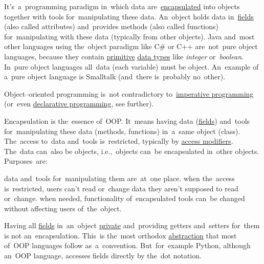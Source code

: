 
\label{objectorientedprogramming}
It's~a~programming paradigm in~which data are~\hyperref[encapsulation]{encapsulated} into objects together with tools for~manipulating these data.
An~object holds data in~\hyperref[variablefieldproperty]{fields} (also called attributes) and~provides methods (also called functions) for~manipulating with these data (typically from other objects).
Java and~most other languages using the~object paradigm like C\# or C++ are~not~pure object languages, because they contain \hyperref[javadatatypes]{primitive} \hyperref[datatypes]{data types} like \textit{integer} or~\textit{boolean}.
In~pure object languages all~data (each variable) must be object.
An~example of a~pure object language is Smalltalk (and~there is~probably no~other).

\warning Object--oriented programming is~not contradictory to~\hyperref[imperativeprogramming]{imperative programming} (or~even \hyperref[declarativeprogramming]{declarative programming}, see further).


\label{encapsulation}
Encapsulation is the~essence of~OOP\@.
It~means having data (\hyperref[variablefieldproperty]{fields}) and~tools for~manipulating these data (methods, functions) in~a~same object (class).
The~access to~data and~tools is~restricted, typically by \hyperref[javaaccessmodifiers]{access modifiers}.
The~data can~also be objects, i.e.,~objects can~be encapsulated in~other objects.
Purposes~are:
\begin{itemize}
     data and~tools for~manipulating them are~at~one place.
     when the~access is~restricted, users can't read or~change data they aren't supposed to read or~change.
     when needed, functionality of~encapsulated tools can~be changed without affecting users of~the~object.
\end{itemize}

\warning Having all \hyperref[variablefieldproperty]{fields} in~an~object \hyperref[javaprivate]{private} and~providing getters and~setters for~them is not an~encapsulation.
This~is the~most orthodox \hyperref[abstraction]{abstraction} that most of~OOP languages follow as~a~convention.
But~for~example Python, although an~OOP language, accesses fields directly by the~dot notation.
\newpage

